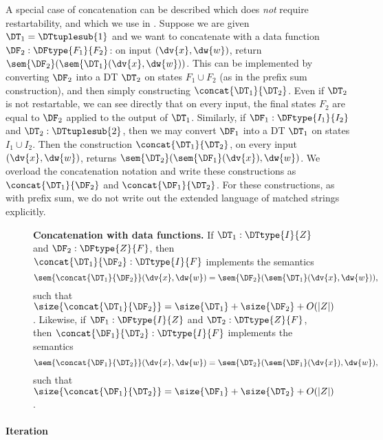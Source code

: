 A special case of concatenation can be described which does \emph{not} require restartability, and which we use in . Suppose we are given $\DT_1 = \DTtuplesub{1}$ and we want to concatenate with a data function $\DF_2: \DFtype{F_1}{F_2}$: on input $(\dv{x}, \dw{w})$, return $\sem{\DF_2}(\sem{\DT_1}(\dv{x},\dw{w}))$. This can be implemented by converting $\DF_2$ into a DT $\DT_2$ on states $F_1 \cup F_2$ (as in the prefix sum construction), and then simply constructing $\concat{\DT_1}{\DT_2}$. Even if $\DT_2$ is not restartable, we can see directly that on every input, the final states $F_2$ are equal to $\DF_2$ applied to the output of $\DT_1$.
Similarly, if $\DF_1: \DFtype{I_1}{I_2}$ and $\DT_2: \DTtuplesub{2}$, then we may convert $\DF_1$ into a DT $\DT_1$ on states $I_1 \cup I_2$. Then the construction $\concat{\DT_1}{\DT_2}$, on every input $(\dv{x},\dw{w})$, returns $\sem{\DT_2}(\sem{\DF_1}(\dv{x}),\dw{w})$.
We overload the concatenation notation and write these constructions as $\concat{\DT_1}{\DF_2}$ and $\concat{\DF_1}{\DT_2}$. For these constructions, as with prefix sum, we do not write out the extended language of matched strings explicitly.

\begin{figure}[H]
\begin{dtbox}
\textbf{Concatenation with data functions.}
If $\DT_1: \DTtype{I}{Z}$ and $\DF_2: \DFtype{Z}{F}$, then $\concat{\DT_1}{\DF_2} : \DTtype{I}{F}$ implements the semantics
\[
\sem{\concat{\DT_1}{\DF_2}}(\dv{x},\dw{w}) = \sem{\DF_2}(\sem{\DT_1}(\dv{x},\dw{w})),
\]
such that $\size{\concat{\DT_1}{\DF_2}} = \size{\DT_1} + \size{\DF_2} + O(|Z|)$.
Likewise, if $\DF_1: \DFtype{I}{Z}$ and $\DT_2: \DTtype{Z}{F}$, then
$\concat{\DF_1}{\DT_2} : \DTtype{I}{F}$ implements the semantics
\[
\sem{\concat{\DF_1}{\DT_2}}(\dv{x},\dw{w}) =
\sem{\DT_2}(\sem{\DF_1}(\dv{x}),\dw{w}),
\]
such that $\size{\concat{\DF_1}{\DT_2}} = \size{\DF_1} + \size{\DT_2} + O(|Z|)$.
\end{dtbox}

\label{dt:fig:concatenation-with-DF}
\end{figure}

\paragraph*{Iteration}

